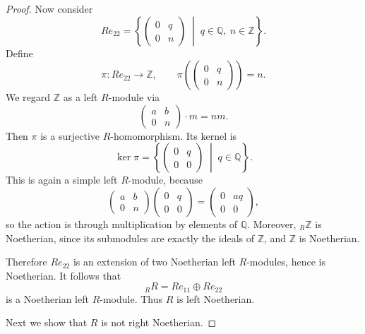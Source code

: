\begin{proof}
    Now consider
    \[
        Re_{22}
        =
        \left\{
        \begin{pmatrix}
            0 & q \\
            0 & n
        \end{pmatrix}
        \;\middle|\;
        q\in\mathbb{Q},\ n\in\mathbb{Z}
        \right\}.
    \]
    Define
    \[
        \pi:Re_{22}\longrightarrow \mathbb{Z},
        \qquad
        \pi\!\left(
        \begin{pmatrix}
                0 & q \\
                0 & n
            \end{pmatrix}
        \right)=n.
    \]
    We regard $\mathbb{Z}$ as a left $R$-module via
    \[
        \begin{pmatrix}
            a & b \\
            0 & n
        \end{pmatrix}\cdot m = nm.
    \]
    Then $\pi$ is a surjective $R$-homomorphism. Its kernel is
    \[
        \ker\pi=
        \left\{
        \begin{pmatrix}
            0 & q \\
            0 & 0
        \end{pmatrix}
        \;\middle|\;
        q\in\mathbb{Q}
        \right\}.
    \]
    This is again a simple left $R$-module, because
    \[
        \begin{pmatrix}
            a & b \\
            0 & n
        \end{pmatrix}
        \begin{pmatrix}
            0 & q \\
            0 & 0
        \end{pmatrix}
        =
        \begin{pmatrix}
            0 & aq \\
            0 & 0
        \end{pmatrix},
    \]
    so the action is through multiplication by elements of $\mathbb{Q}$.
    Moreover, ${}_R\mathbb{Z}$ is Noetherian, since its submodules are exactly
    the ideals of $\mathbb{Z}$, and $\mathbb{Z}$ is Noetherian.

    Therefore $Re_{22}$ is an extension of two Noetherian left $R$-modules,
    hence is Noetherian. It follows that
    \[
        {}_R R = Re_{11}\oplus Re_{22}
    \]
    is a Noetherian left $R$-module. Thus $R$ is left Noetherian.

    Next we show that $R$ is not right Noetherian.


\end{proof}

